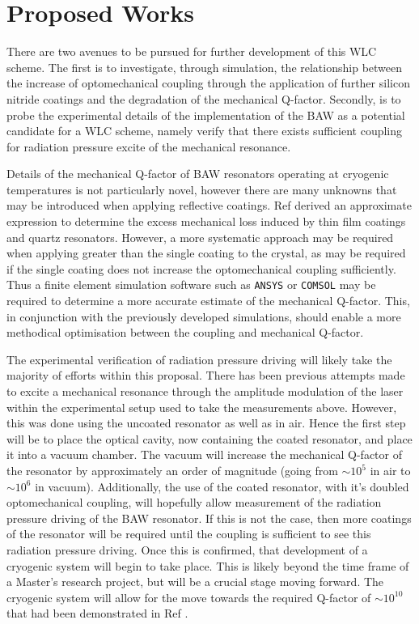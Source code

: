 \documentclass[aps,  
                a4paper, 
                amsmath, 
                amssymb, 
                preprint,
                tightenlines,  
                amsfonts,
                nofootinbib,
                onecolumn,
                titlepage,
                10pt
            ]{revtex4-2}
\begin{document}
    \section{Proposed Works}
    There are two avenues to be pursued for further development of this WLC scheme. The first is to investigate, through simulation, the relationship between the increase of optomechanical coupling through the application of further silicon nitride coatings and the degradation of the mechanical Q-factor. Secondly, is to probe the experimental details of the implementation of the BAW as a potential candidate for a WLC scheme, namely verify that there exists sufficient coupling for radiation pressure excite of the mechanical resonance.
    \par
    Details of the mechanical Q-factor of BAW resonators operating at cryogenic temperatures is not particularly novel, however there are many unknowns that may be introduced when applying reflective coatings. Ref \cite{galliou2016} derived an approximate expression to determine the excess mechanical loss induced by thin film coatings and quartz resonators. However, a more systematic approach may be required when applying greater than the single coating to the crystal, as may be required if the single coating does not increase the optomechanical coupling sufficiently. Thus a finite element simulation software such as \texttt{ANSYS} or \texttt{COMSOL} may be required to determine a more accurate estimate of the mechanical Q-factor. This, in conjunction with the previously developed simulations, should enable a more methodical optimisation between the coupling and mechanical Q-factor. 
    \par
    The experimental verification of radiation pressure driving will likely take the majority of efforts within this proposal. There has been previous attempts made to excite a mechanical resonance through the amplitude modulation of the laser within the experimental setup used to take the measurements above. However, this was done using the uncoated resonator as well as in air. Hence the first step will be to place the optical cavity, now containing the coated resonator, and place it into a vacuum chamber. The vacuum will increase the mechanical Q-factor of the resonator by approximately an order of magnitude (going from $\sim10^5$ in air to $\sim10^6$ in vacuum). Additionally, the use of the coated resonator, with it's doubled optomechanical coupling, will hopefully allow measurement of the radiation pressure driving of the BAW resonator. If this is not the case, then more coatings of the resonator will be required until the coupling is sufficient to see this radiation pressure driving. Once this is confirmed, that development of a cryogenic system will begin to take place. This is likely beyond the time frame of a Master's research project, but will be a crucial stage moving forward. The cryogenic system will allow for the move towards the required Q-factor of $\sim10^{10}$ that had been demonstrated in Ref \cite{galliou2013}.
\end{document}
